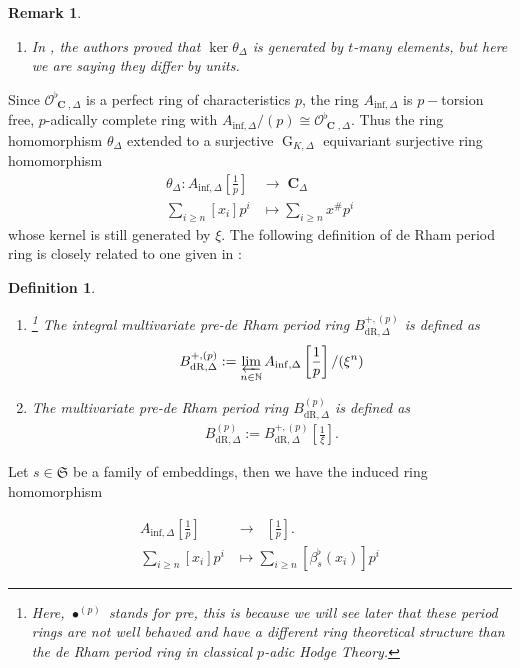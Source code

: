 \documentclass{amsart}
\newtheorem{remark}[proposition]{Remark}
\newtheorem{definition}[proposition]{Definition}
\newcommand{\mAinf}{A_{\mathrm{inf},\Delta}}
\DeclareMathOperator{\Ainf}{A_{inf}}
\DeclareMathOperator{\C}{\textbf{C}}
\newcommand{\pmBdrp}{B^{+,(p)}_{\mathrm{dR},\Delta}}
\newcommand{\pmBdr}{B^{(p)}_{\mathrm{dR},\Delta}}
\DeclareMathOperator{\G}{G}
\begin{document}
\begin{remark}
    \begin{enumerate}
        \item[(i)]  In \cite{BCM}, the authors proved that $\ker\theta_\Delta$ is generated by $t$-many elements, but here we are saying they differ by units.
    \end{enumerate}
\end{remark}

Since $\mathcal{O}^\flat_{\C,\Delta}$ is a perfect ring of characteristics $p$, the ring $\mAinf$ is $p-$torsion free, $p$-adically complete ring with $\mAinf/(p)\cong \mathcal{O}^\flat_{\C,\Delta}$. Thus the ring homomorphism $\theta_\Delta$ extended to a surjective $\G_{K,\Delta}$ equivariant surjective ring homomorphism  
\begin{align*}
   \theta_\Delta: \mAinf\left[\frac{1}{p}\right]&\to {\C}_\Delta\\
   \sum\limits_{i\geq n}[x_i]p^i &\mapsto \sum\limits_{i\geq n} x^\#p^i
\end{align*}
whose kernel is still generated by $\xi$. The following definition of de Rham period ring is closely related to one given in \cite{BCM}:

\begin{definition}
    \begin{enumerate}
        \item[(i)]\footnote{Here, $\bullet^{(p)}$ stands for pre, this is because we will see later that these period rings are not well behaved and have a different ring theoretical structure than the de Rham period ring in classical $p$-adic Hodge Theory.} The \emph{integral multivariate pre-de Rham period ring} $\pmBdrp$  is defined as
        \begin{align*}
            \pmBdrp:=\varprojlim\limits_{n\in\mathbb{N}}\mAinf\left[\frac{1}{p}\right]/(\xi^n)
        \end{align*}
        \item[(ii)] The \emph{multivariate pre-de Rham period ring} $\pmBdr$ is defined as
        \begin{align*}
            \pmBdr:=\pmBdrp\left[\frac{1}{\xi}\right].
        \end{align*}
    \end{enumerate}
\end{definition}

Let $s\in\mathfrak{S}$ be a family of embeddings, then we have the induced ring homomorphism

\begin{align*}
    \mAinf\left[\frac{1}{p}\right]&\to \Ainf\left[\frac{1}{p}\right].\\
     \sum\limits_{i\geq n}[x_i]p^i&\mapsto \sum\limits_{i\geq n}[\beta^\flat_s(x_i)]p^i
\end{align*}
\end{document}
